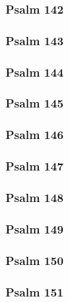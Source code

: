 \documentclass[12pt]{extarticle}
\begin{document}
\begin{multicols}{2}
\subsubsection{Psalm 142}

\newpage

\subsubsection{Psalm 143}

\newpage

\subsubsection{Psalm 144}

\newpage

\subsubsection{Psalm 145}

\newpage

\subsubsection{Psalm 146}

\newpage

\subsubsection{Psalm 147}

\newpage

\subsubsection{Psalm 148}

\newpage

\subsubsection{Psalm 149}

\newpage

\subsubsection{Psalm 150}

\newpage

\subsubsection{Psalm 151}

\newpage

\end{multicols}
\end{document}
